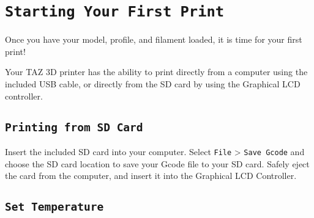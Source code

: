 \section{\texttt{Starting Your First Print}}
Once you have your model, profile, and filament loaded, it is time for your first print! 






Your TAZ 3D printer has the ability to print directly from a computer using the included USB cable, or directly from the SD card by using the Graphical LCD controller.



\subsection{\texttt{Printing from SD Card}}

Insert the included SD card into your computer. Select \texttt{File} > \texttt{Save Gcode} and choose the SD card location to save your Gcode file to your SD card. Safely eject the card from the computer, and insert it into the Graphical LCD Controller. 

\subsection{\texttt{Set Temperature}}

